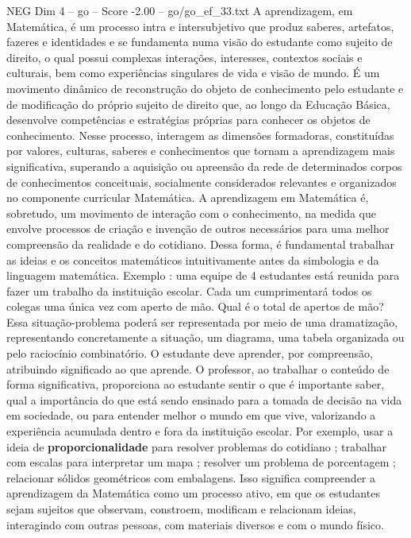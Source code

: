\begin{textsample}{NEG Dim 4 – go – Score -2.00 – go/go\_ef\_33.txt}  \label{ex:f4_neg_229}
A aprendizagem, em Matemática, é um processo intra e intersubjetivo que produz saberes, artefatos, fazeres e identidades e se fundamenta numa visão do estudante como sujeito de direito, o qual possui complexas interações, interesses, contextos sociais e culturais, bem como experiências singulares de vida e visão de mundo.
É um movimento dinâmico de reconstrução do objeto de conhecimento pelo estudante e de modificação do próprio sujeito de direito que, ao longo da Educação Básica, desenvolve competências e estratégias próprias para conhecer os objetos de conhecimento.
Nesse processo, interagem as dimensões formadoras, constituídas por valores, culturas, saberes e conhecimentos que tornam a aprendizagem mais significativa, superando a aquisição ou apreensão da rede de determinados corpos de conhecimentos conceituais, socialmente considerados relevantes e organizados no componente curricular Matemática.
A aprendizagem em Matemática é, sobretudo, um movimento de interação com o conhecimento, na medida que envolve processos de criação e invenção de outros necessários para uma melhor compreensão da realidade e do cotidiano.
Dessa forma, é fundamental trabalhar as ideias e os conceitos matemáticos intuitivamente antes da simbologia e da linguagem matemática.
Exemplo : uma equipe de 4 estudantes está reunida para fazer um trabalho da instituição escolar.
Cada um cumprimentará todos os colegas uma única vez com aperto de mão.
Qual é o total de apertos de mão?
Essa situação-problema poderá ser representada por meio de uma dramatização, representando concretamente a situação, um diagrama, uma tabela organizada ou pelo raciocínio combinatório.
O estudante deve aprender, por compreensão, atribuindo significado ao que aprende.
O professor, ao trabalhar o conteúdo de forma significativa, proporciona ao estudante sentir o que é importante saber, qual a importância do que está sendo ensinado para a tomada de decisão na vida em sociedade, ou para entender melhor o mundo em que vive, valorizando a experiência acumulada dentro e fora da instituição escolar.
Por exemplo, usar a ideia de \textbf{proporcionalidade} para resolver problemas do cotidiano ; trabalhar com escalas para interpretar um mapa ; resolver um problema de porcentagem ; relacionar sólidos geométricos com embalagens.
Isso significa compreender a aprendizagem da Matemática como um processo ativo, em que os estudantes sejam sujeitos que observam, constroem, modificam e relacionam ideias, interagindo com outras pessoas, com materiais diversos e com o mundo físico.

\end{textsample}
